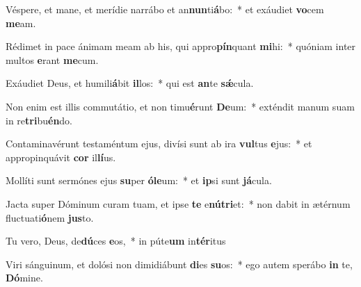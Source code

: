 \item Véspere, et mane, et merídie narrábo et an\textbf{nun}ti\textbf{á}bo:~* et exáudiet \textbf{vo}cem \textbf{me}am.
\item Rédimet in pace ánimam meam ab his, qui appro\textbf{pín}quant \textbf{mi}hi:~* quóniam inter multos \textbf{e}rant \textbf{me}cum.
\item Exáudiet Deus, et humili\textbf{á}bit \textbf{il}los:~* qui est \textbf{an}te \textbf{sǽ}cula.
\item Non enim est illis commutátio, et non timu\textbf{é}runt \textbf{De}um:~* exténdit manum suam in re\textbf{tri}bu\textbf{én}do.
\item Contaminavérunt testaméntum ejus, divísi sunt ab ira \textbf{vul}tus \textbf{e}jus:~* et appropinquávit \textbf{cor} il\textbf{lí}us.
\item Mollíti sunt sermónes ejus \textbf{su}per \textbf{ó}\textbf{le}um:~* et \textbf{ip}si sunt \textbf{já}cula.
\item Jacta super Dóminum curam tuam, et ipse \textbf{te} e\textbf{nú}\textbf{tri}et:~* non dabit in ætérnum fluctuati\textbf{ó}nem \textbf{jus}to.
\item Tu vero, Deus, de\textbf{dú}ces \textbf{e}os,~* in púte\textbf{um} in\textbf{tér}itus
\item Viri sánguinum, et dolósi non dimidiábunt \textbf{di}es \textbf{su}os:~* ego autem sperábo \textbf{in} te, \textbf{Dó}mine.
